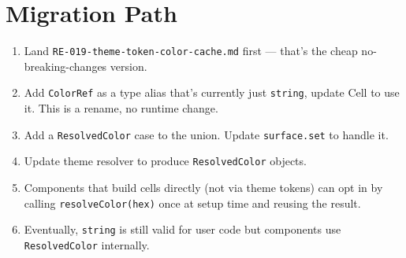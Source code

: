\section{Migration Path}\label{record-370-migration-path}

\begin{enumerate}
\def\labelenumi{\arabic{enumi}.}
\tightlist
\item
  Land \texttt{R\allowbreak{}E\allowbreak{}-\allowbreak{}0\allowbreak{}1\allowbreak{}9\allowbreak{}-\allowbreak{}t\allowbreak{}h\allowbreak{}e\allowbreak{}m\allowbreak{}e\allowbreak{}-\allowbreak{}t\allowbreak{}o\allowbreak{}k\allowbreak{}e\allowbreak{}n\allowbreak{}-\allowbreak{}c\allowbreak{}o\allowbreak{}l\allowbreak{}o\allowbreak{}r\allowbreak{}-\allowbreak{}c\allowbreak{}a\allowbreak{}c\allowbreak{}h\allowbreak{}e\allowbreak{}.\allowbreak{}m\allowbreak{}d} first --- that's the cheap no-breaking-changes version.
\item
  Add \texttt{C\allowbreak{}o\allowbreak{}l\allowbreak{}o\allowbreak{}r\allowbreak{}R\allowbreak{}e\allowbreak{}f} as a type alias that's currently just \texttt{s\allowbreak{}t\allowbreak{}r\allowbreak{}i\allowbreak{}n\allowbreak{}g}, update Cell to use it. This is a rename, no runtime change.
\item
  Add a \texttt{R\allowbreak{}e\allowbreak{}s\allowbreak{}o\allowbreak{}l\allowbreak{}v\allowbreak{}e\allowbreak{}d\allowbreak{}C\allowbreak{}o\allowbreak{}l\allowbreak{}o\allowbreak{}r} case to the union. Update \texttt{s\allowbreak{}u\allowbreak{}r\allowbreak{}f\allowbreak{}a\allowbreak{}c\allowbreak{}e\allowbreak{}.\allowbreak{}s\allowbreak{}e\allowbreak{}t} to handle it.
\item
  Update theme resolver to produce \texttt{R\allowbreak{}e\allowbreak{}s\allowbreak{}o\allowbreak{}l\allowbreak{}v\allowbreak{}e\allowbreak{}d\allowbreak{}C\allowbreak{}o\allowbreak{}l\allowbreak{}o\allowbreak{}r} objects.
\item
  Components that build cells directly (not via theme tokens) can opt in by calling \texttt{r\allowbreak{}e\allowbreak{}s\allowbreak{}o\allowbreak{}l\allowbreak{}v\allowbreak{}e\allowbreak{}C\allowbreak{}o\allowbreak{}l\allowbreak{}o\allowbreak{}r\allowbreak{}(\allowbreak{}h\allowbreak{}e\allowbreak{}x\allowbreak{})} once at setup time and reusing the result.
\item
  Eventually, \texttt{s\allowbreak{}t\allowbreak{}r\allowbreak{}i\allowbreak{}n\allowbreak{}g} is still valid for user code but components use \texttt{R\allowbreak{}e\allowbreak{}s\allowbreak{}o\allowbreak{}l\allowbreak{}v\allowbreak{}e\allowbreak{}d\allowbreak{}C\allowbreak{}o\allowbreak{}l\allowbreak{}o\allowbreak{}r} internally.
\end{enumerate}


